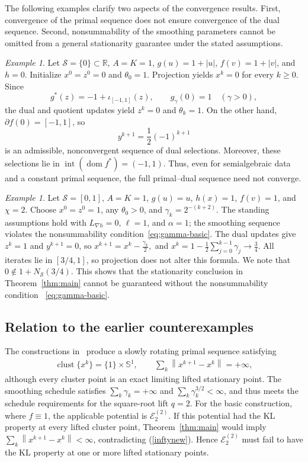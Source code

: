 \documentclass[9pt]{article}
\numberwithin{equation}{section}
\theoremstyle{definition}
\theoremstyle{remark}
\newtheorem{example}[theorem]{Example}
\newcommand{\R}{\mathbb R}
\newcommand{\Sset}{\mathcal S}
\newcommand{\ind}{\iota}
\newcommand{\norm}[1]{\left\lVert #1\right\rVert}
\newcommand{\abs}[1]{\left\lvert #1\right\rvert}
\newcommand{\Ecal}{\mathcal E}
\DeclareMathOperator{\dom}{dom}
\DeclareMathOperator{\clust}{clust}
\begin{document}
The following examples clarify two aspects of the convergence results.
First, convergence  of the primal sequence does not
ensure convergence of the dual sequence. Second, nonsummability of
the smoothing parameters cannot be omitted from a general
stationarity guarantee under the stated assumptions.

\begin{example}
\label{ex:y-oscillation}
Let $\Sset=\{0\}\subset\R$, $A=K=1$,
$g(u)=1+\abs u$, $f(v)=1+\abs v$, and $h=0$.
Initialize $x^0=z^0=0$ and $\theta_0=1$.
Projection yields $x^k=0$ for every $k\geq0$.
Since
\[
 g^*(z)=-1+\ind_{[-1,1]}(z),
 \qquad g_\gamma(0)=1 \quad(\gamma>0),
\]
the dual and quotient updates yield $z^k=0$ and $\theta_k=1$.
On the other hand, $\partial f(0)=[-1,1]$, so
\[
 y^{k+1}=\frac12(-1)^{k+1}
\]
is an admissible, nonconvergent sequence of dual selections.
Moreover, these selections lie in
$\operatorname{int}(\dom f^*)=(-1,1)$.
Thus, even for semialgebraic data and a constant primal sequence,
the full primal--dual sequence need not converge.
\end{example}


\begin{example}\label{ex:summable}
Let $\Sset=[0,1]$, $A=K=1$, $g(u)=u$, $h(x)=1$, $f(v)=1$,
and $\chi=2$. Choose $x^0=z^0=1$, any $\theta_0>0$, and
$\gamma_k=2^{-(k+2)}$. The standing  assumptions hold with
$L_{\nabla h}=0$, $\ell=1$, and $\alpha=1$; the smoothing sequence
violates the nonsummability condition~\eqref{eq:gamma-basic}.
The dual updates give $z^k=1$ and $y^{k+1}=0$, so
$
 x^{k+1}=x^k-\frac{\gamma_k}{2},$ and
 $x^k=1-\frac12\sum_{j=0}^{k-1}\gamma_j\rightarrow\frac{3}{4}$.
All iterates lie in $[3/4,1]$, so projection does not alter this formula.
We note that
$0\notin1+N_{\Sset}(3/4)$. This shows that the stationarity conclusion
in Theorem~\ref{thm:main} cannot  be guaranteed without the nonsummability condition ~\eqref{eq:gamma-basic}.
\end{example}


\subsection{Relation to the earlier
counterexamples}
\label{sec:relationship-counterexamples}
The constructions in~\cite{Tao2026} produce a slowly rotating primal
sequence satisfying
\begin{eqnarray}\label{inftynew}
 \clust\{x^k\}=\{1\}\times\mathbb S^1,
 \qquad
 \sum_k\norm{x^{k+1}-x^k}=+\infty,
\end{eqnarray}
although every cluster point is an exact limiting lifted stationary
point. The smoothing schedule satisfies
$\sum_k\gamma_k=+\infty$ and $\sum_k\gamma_k^{3/2}<\infty$,
and thus meets the schedule requirements for the square-root lift
$q=2$. For the basic construction, where $f\equiv1$, the applicable
potential is $\Ecal_2^{(2)}$. If this potential had the KL property
at every lifted cluster point, Theorem~\ref{thm:main} would imply
$\sum_k\norm{x^{k+1}-x^k}<\infty$, contradicting (\ref{inftynew}). Hence $\Ecal_2^{(2)}$ must fail to have the
KL property at one or more lifted stationary points. %
\end{document}
